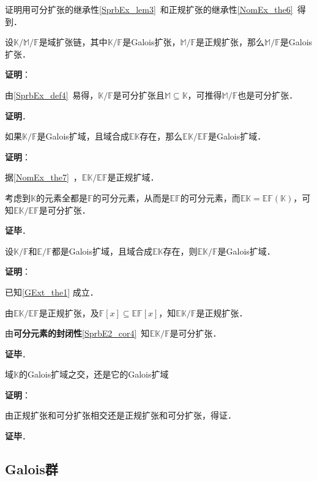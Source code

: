 证明用可分扩张的继承性\autoref{SprbEx_lem3}~和正规扩张的继承性\autoref{NomEx_the6}~得到．

\begin{theorem}{}
设$\mathbb{K}/\mathbb{M}/\mathbb{F}$是域扩张链，其中$\mathbb{K}/\mathbb{F}$是Galois扩张，$\mathbb{M}/\mathbb{F}$是正规扩张，那么$\mathbb{M}/\mathbb{F}$是Galois扩张．
\end{theorem}

\textbf{证明}：

由\autoref{SprbEx_def4}~易得，$\mathbb{K}/\mathbb{F}$是可分扩张且$\mathbb{M}\subseteq\mathbb{K}$，可推得$\mathbb{M}/\mathbb{F}$也是可分扩张．

\textbf{证明}．

\begin{theorem}{}\label{GExt_the1}
如果$\mathbb{K}/\mathbb{F}$是Galois扩域，且域合成$\mathbb{EK}$存在，那么$\mathbb{EK}/\mathbb{EF}$是Galois扩域．
\end{theorem}

\textbf{证明}：

据\autoref{NomEx_the7}~，$\mathbb{EK}/\mathbb{EF}$是正规扩域．

考虑到$\mathbb{K}$的元素全都是$\mathbb{F}$的可分元素，从而是$\mathbb{EF}$的可分元素，而$\mathbb{EK}=\mathbb{EF}(\mathbb{K})$，可知$\mathbb{EK}/\mathbb{EF}$是可分扩张．

\textbf{证毕}．



\begin{theorem}{}
设$\mathbb{K}/\mathbb{F}$和$\mathbb{E}/\mathbb{F}$都是Galois扩域，且域合成$\mathbb{EK}$存在，则$\mathbb{EK}/\mathbb{F}$是Galois扩域．
\end{theorem}

\textbf{证明}：

已知\autoref{GExt_the1} 成立．

由$\mathbb{EK}/\mathbb{EF}$是正规扩张，及$\mathbb{F}[x]\subseteq\mathbb{EF}[x]$，知$\mathbb{EK}/\mathbb{F}$是正规扩张．

由\textbf{可分元素的封闭性}\autoref{SprbE2_cor4}~知$\mathbb{EK}/\mathbb{F}$是可分扩张．

\textbf{证毕}．




\begin{theorem}{}
域$\mathbb{K}$的Galois扩域之交，还是它的Galois扩域
\end{theorem}

\textbf{证明}：

由正规扩张和可分扩张相交还是正规扩张和可分扩张，得证．

\textbf{证毕}．



\subsection{Galois群}


















